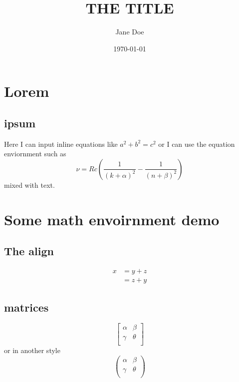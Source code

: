 \documentclass[11pt, oneside]{article}
\title{THE TITLE}
\author{Jane Doe}
\date{\today}
\begin{document}
\maketitle
\tableofcontents

\section{Lorem}
\lipsum[1]
\subsection{ipsum}
Here I can input inline equations like $a^2 + b^2 = c^2$ or I can use the equation enviornment such as
\begin{equation}
    \nu = Rc \left(\frac{1}{(k + \alpha)^2} - \frac{1}{(n + \beta)^2} \right)
\end{equation}
mixed with text.

\section{Some math envoirnment demo}
\subsection{The align}
\begin{align}
    x &= y + z \\
    &= z + y
\end{align}
\subsection{matrices}
    $$  
    \begin{bmatrix}
        \alpha & \beta \\
        \gamma & \theta \\
    \end{bmatrix}
    $$
    or in another style
    $$  
    \begin{pmatrix}
        \alpha & \beta \\
        \gamma & \theta \\
    \end{pmatrix}
    $$
\end{document}

